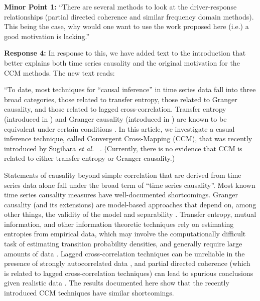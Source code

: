 \documentclass[twocolumn,aps,pre,groupedaddress]{revtex4-1}
\begin{document}
\textbf{Minor Point 1:} ``There are several methods to look at the driver-response relationships (partial directed coherence and similar frequency domain methods).  This being the case, why would one want to use the work proposed here  (i.e.) a good motivation is lacking.''

\textbf{Response 4:}  In response to this, we have added text to the introduction that better explains both time series causality and the original motivation for the CCM methods.  The new text reads: \newline

``To date, most techniques for ``causal inference'' in time series data fall into three broad categories, those related to transfer entropy, those related to Granger causality, and those related to lagged cross-correlation.  Transfer entropy (introduced in \cite{Schreiber2000}) and Granger causality (introduced in \cite{granger1969}) are known to be equivalent under certain conditions \cite{Barnett2009}.  In this article, we investigate a casual inference technique, called Convergent Cross-Mapping (CCM), that was recently introduced by Sugihara {\em et al.\ } \cite{Sugihara2012}.  (Currently, there is no evidence that CCM is related to either transfer entropy or Granger causality.)

Statements of causality beyond simple correlation that are derived from time series data alone fall under the broad term of ``time series causality''.  Most known time series causality measures have well-documented shortcomings.  Granger causality (and its extensions) are model-based approaches that depend on, among other things, the validity of the model \cite{Kaminski2001,Granger1980} and separability \cite{Sugihara2012}.  Transfer entropy, mutual information, and other information theoretic techniques rely on estimating entropies from empirical data, which may involve the computationally difficult task of estimating transition probability densities, and generally require large amounts of data \cite{Kaiser2002,Schindler2007}.  Lagged cross-correlation techniques can be unreliable in the presence of strongly autocorrelated data \cite{box2013}, and partial directed coherence (which is related to lagged cross-correlation techniques) can lead to spurious conclusions given realistic data \cite{pascual2014}.  The results documented here show that the recently introduced CCM techniques have similar shortcomings.  
\end{document}
